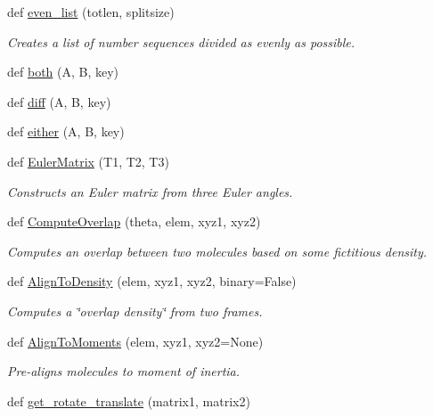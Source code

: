 \begin{DoxyCompactItemize}
def \hyperlink{namespacesrc_1_1molecule_a097327ba25a338d642f7ab11dadb55cc}{even\+\_\+list} (totlen, splitsize)
\begin{DoxyCompactList}\small\item\em Creates a list of number sequences divided as evenly as possible. \end{DoxyCompactList}\item 
def \hyperlink{namespacesrc_1_1molecule_a406a751e54f7e50da529c5d45f7f7de8}{both} (A, B, key)
\item 
def \hyperlink{namespacesrc_1_1molecule_a9de48d83dc7f53e25b86a4a6076e3185}{diff} (A, B, key)
\item 
def \hyperlink{namespacesrc_1_1molecule_a53a3e04b9a57f9217a193d92c2062890}{either} (A, B, key)
\item 
def \hyperlink{namespacesrc_1_1molecule_a0b808b0181dfa0aed5879c61f683ec1a}{Euler\+Matrix} (T1, T2, T3)
\begin{DoxyCompactList}\small\item\em Constructs an Euler matrix from three Euler angles. \end{DoxyCompactList}\item 
def \hyperlink{namespacesrc_1_1molecule_a32c3d0fa2efc4d240274218803e1f42b}{Compute\+Overlap} (theta, elem, xyz1, xyz2)
\begin{DoxyCompactList}\small\item\em Computes an \textquotesingle{}overlap\textquotesingle{} between two molecules based on some fictitious density. \end{DoxyCompactList}\item 
def \hyperlink{namespacesrc_1_1molecule_af5506b829909137d2b0b586eb1349c85}{Align\+To\+Density} (elem, xyz1, xyz2, binary=False)
\begin{DoxyCompactList}\small\item\em Computes a \char`\"{}overlap density\char`\"{} from two frames. \end{DoxyCompactList}\item 
def \hyperlink{namespacesrc_1_1molecule_a06bd27c59ccdbde31fbefbdec2daf1ad}{Align\+To\+Moments} (elem, xyz1, xyz2=None)
\begin{DoxyCompactList}\small\item\em Pre-\/aligns molecules to \textquotesingle{}moment of inertia\textquotesingle{}. \end{DoxyCompactList}\item 
def \hyperlink{namespacesrc_1_1molecule_aeeda6442bbd025dc5d98d8bcf14600b5}{get\+\_\+rotate\+\_\+translate} (matrix1, matrix2)

\end{DoxyCompactItemize}
